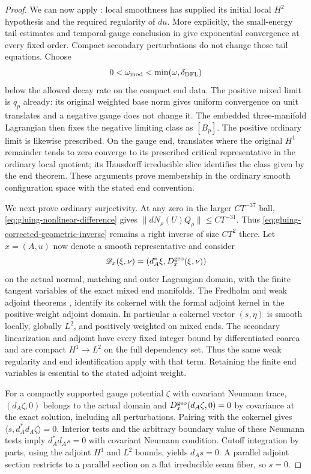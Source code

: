 \documentclass[11pt]{amsart}
\theoremstyle{definition}
\theoremstyle{remark}
\theoremstyle{plain}
\begin{document}
\begin{proof}
We can now apply \cite[Proposition~3.6]{DaeFukLip21a}: local
smoothness has supplied its initial local $H^2$ hypothesis and
the required regularity of $du$. More explicitly, the small-energy
tail estimates and temporal-gauge conclusion in
\cite[Propositions~5.24, 5.27 and 5.29]{DaeFukLip21a} give
exponential convergence at every fixed order. Compact secondary
perturbations do not change those tail equations. Choose
\begin{equation}\label{eq:gluing-moduli-weight}
                   0<\omega_{\rm mod}<\min(\omega,\delta_{\rm DFL})
\end{equation}
below the allowed decay rate on the compact end data. The positive
mixed limit is $q_p$ already: its original weighted base norm gives
uniform convergence on unit translates and a negative gauge does
not change it. The embedded three-manifold Lagrangian then fixes
the negative limiting class as $[B_p]$. The positive ordinary
limit is likewise prescribed. On the gauge end, translates where
the original $H^1$ remainder tends to zero converge to its
prescribed critical representative in the ordinary local quotient;
its Hausdorff irreducible slice identifies the class given by the
end theorem. These arguments prove membership in the ordinary
smooth configuration space with the stated end convention.

We next prove ordinary surjectivity. At any zero in the larger
$CT^{-37}$ ball, \eqref{eq:gluing-nonlinear-difference} gives
$\|dN_\rho(U)Q_\rho\|\leq CT^{-31}$. Thus
\eqref{eq:gluing-corrected-geometric-inverse} remains a right
inverse of size $CT^2$ there. Let $x=(A,u)$ now denote a
smooth representative and consider
\[
          \mathscr D_x(\xi,\nu)=(d_A^*\xi,D_x^{\rm geo}(\xi,\nu))
\]
on the actual normal, matching and outer Lagrangian domain, with
the finite tangent variables of the exact mixed end manifolds.
The Fredholm and weak adjoint theorems
\cite[Theorem~4.12]{DaeFukLip21a},
\cite[Theorem~5.9]{DaeFukLip21b} identify its cokernel with
the formal adjoint kernel in the positive-weight adjoint domain.
In particular a cokernel vector $(s,\eta)$ is smooth locally,
globally $L^2$, and positively weighted on mixed ends.
The secondary linearization and adjoint have every fixed integer
bound by differentiated coarea and are compact $H^1\to L^2$
on the full dependency set. Thus the same weak regularity and end
identification apply with that term. Retaining the finite end
variables is essential to the stated adjoint weight.

For a compactly supported gauge potential $\zeta$ with covariant
Neumann trace, $(d_A\zeta,0)$ belongs to the actual domain and
$D_x^{\rm geo}(d_A\zeta,0)=0$ by covariance at the exact
solution, including all perturbations. Pairing with the cokernel
gives $\langle s,d_A^*d_A\zeta\rangle=0$. Interior tests and
the arbitrary boundary value of these Neumann tests imply
$d_A^*d_As=0$ with covariant Neumann condition. Cutoff integration
by parts, using the adjoint $H^1$ and $L^2$ bounds, yields
$d_As=0$. A parallel adjoint section restricts to a parallel section
on a flat irreducible seam fiber, so $s=0$.


\end{proof}
\end{document}
